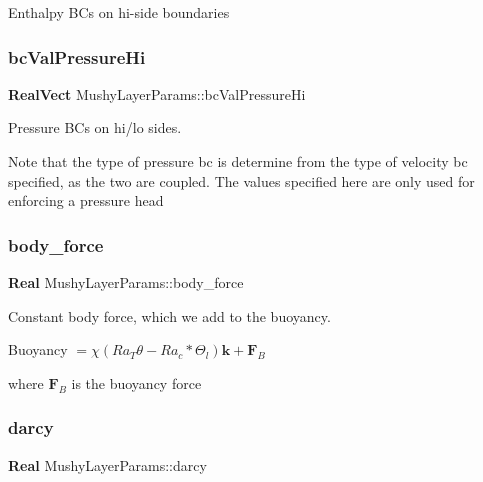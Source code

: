 Enthalpy B\+Cs on hi-\/side boundaries \mbox{\label{class_mushy_layer_params_a2a636c632d746bcdbe7f29c0b70c50d2}} 
\subsubsection{\texorpdfstring{bc\+Val\+Pressure\+Hi}{bcValPressureHi}}
{\footnotesize\ttfamily \textbf{ Real\+Vect} Mushy\+Layer\+Params\+::bc\+Val\+Pressure\+Hi}



Pressure B\+Cs on hi/lo sides. 

Note that the type of pressure bc is determine from the type of velocity bc specified, as the two are coupled. The values specified here are only used for enforcing a pressure head \mbox{\label{class_mushy_layer_params_afa6da58ee2a066966d6745040c03bc3c}} 
\subsubsection{\texorpdfstring{body\+\_\+force}{body\_force}}
{\footnotesize\ttfamily \textbf{ Real} Mushy\+Layer\+Params\+::body\+\_\+force}



Constant body force, which we add to the buoyancy. 

Buoyancy $ = \chi (Ra_T \theta - Ra_c*\Theta_l) \mathbf{k} + \mathbf{F}_B $

where $ \mathbf{F}_B $ is the buoyancy force \mbox{\label{class_mushy_layer_params_a1cc8074618d57c994ce1771cba4a973c}} 
\subsubsection{\texorpdfstring{darcy}{darcy}}
{\footnotesize\ttfamily \textbf{ Real} Mushy\+Layer\+Params\+::darcy}



